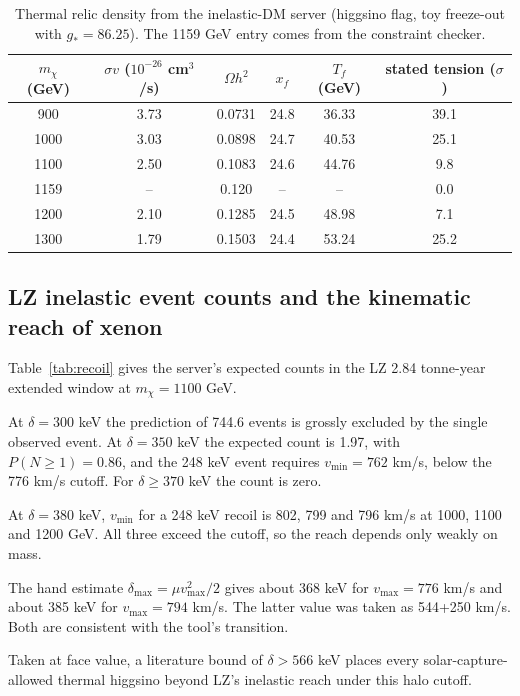 \documentclass[11pt,a4paper]{article}
\begin{document}
\begin{table}[h]
\centering
\begin{tabular}{cccccc}
\toprule
$m_\chi$ (GeV) & $\sigma v$ ($10^{-26}$ cm$^3$/s) & $\Omega h^2$ & $x_f$ & $T_f$ (GeV) & stated tension ($\sigma$)\\
\midrule
900 & 3.73 & 0.0731 & 24.8 & 36.33 & 39.1\\
1000 & 3.03 & 0.0898 & 24.7 & 40.53 & 25.1\\
1100 & 2.50 & 0.1083 & 24.6 & 44.76 & 9.8\\
1159 & -- & 0.120 & -- & -- & 0.0\\
1200 & 2.10 & 0.1285 & 24.5 & 48.98 & 7.1\\
1300 & 1.79 & 0.1503 & 24.4 & 53.24 & 25.2\\
\bottomrule
\end{tabular}
\caption{Thermal relic density from the inelastic-DM server (higgsino flag, toy freeze-out with $g_*=86.25$). The 1159 GeV entry comes from the constraint checker.}
\label{tab:relic}
\end{table}

\subsection{LZ inelastic event counts and the kinematic reach of xenon}
Table~\ref{tab:recoil} gives the server's expected counts in the LZ 2.84 tonne-year extended window at $m_\chi = 1100$ GeV.

At $\delta = 300$ keV the prediction of 744.6 events is grossly excluded by the single observed event. At $\delta = 350$ keV the expected count is 1.97, with $P(N\geq1) = 0.86$, and the 248 keV event requires $v_{\min} = 762$ km/s, below the 776 km/s cutoff. For $\delta \geq 370$ keV the count is zero.

At $\delta = 380$ keV, $v_{\min}$ for a 248 keV recoil is 802, 799 and 796 km/s at 1000, 1100 and 1200 GeV. All three exceed the cutoff, so the reach depends only weakly on mass.

The hand estimate $\delta_{\max} = \mu v_{\max}^2/2$ gives about 368 keV for $v_{\max} = 776$ km/s and about 385 keV for $v_{\max} = 794$ km/s. The latter value was taken as 544+250 km/s. Both are consistent with the tool's transition.

Taken at face value, a literature bound of $\delta > 566$ keV places every solar-capture-allowed thermal higgsino beyond LZ's inelastic reach under this halo cutoff.
\end{document}
